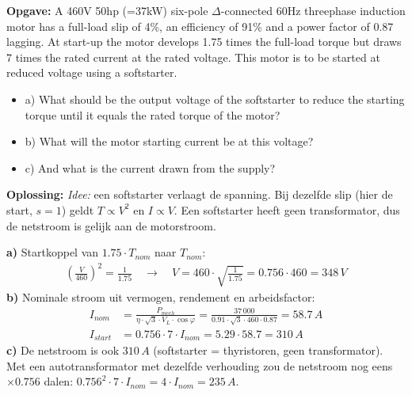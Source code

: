 \begin{oefenblok}
    \textbf{Opgave:}
    \newline
    A 460V 50hp (=37kW) six-pole $\Delta$-connected 60Hz threephase induction motor has a
    full-load slip of 4\%, an efficiency of 91\% and a power factor of 0.87 lagging.
    At start-up the motor develops 1.75 times the full-load torque but draws 7 times the
    rated current at the rated voltage.
    This motor is to be started at reduced voltage using a softstarter.
\begin{itemize}
 \item a) What should be the output voltage of the softstarter to reduce the starting
 torque until it equals the rated torque of the motor?
 \item b) What will the motor starting current be at this voltage?
 \item c) And what is the current drawn from the supply?
\end{itemize}
   \textbf{Oplossing:}
   \newline
      \textit{Idee:} een softstarter verlaagt de spanning.
   Bij dezelfde slip (hier de start, $s = 1$) geldt $T \propto V^2$ en $I \propto V$.
   Een softstarter heeft geen transformator, dus de netstroom is gelijk aan de motorstroom.

   \textbf{a)} Startkoppel van $1.75 \cdot T_{nom}$ naar $T_{nom}$:
   \begin{align}
       \left(\frac{V}{460}\right)^2 = \frac{1}{1.75} \quad \rightarrow \quad
       V = 460 \cdot \sqrt{\frac{1}{1.75}} = 0.756 \cdot 460 = 348\,V \tag{1}
   \end{align}
   \textbf{b)} Nominale stroom uit vermogen, rendement en arbeidsfactor:
   \begin{align}
       I_{nom} &= \frac{P_{mech}}{\eta \cdot \sqrt{3} \cdot V_L \cdot \cos\varphi}
       = \frac{37\,000}{0.91 \cdot \sqrt{3} \cdot 460 \cdot 0.87} = 58.7\,A \tag{2} \\
       I_{start} &= 0.756 \cdot 7 \cdot I_{nom} = 5.29 \cdot 58.7 = 310\,A \tag{3}
   \end{align}
   \textbf{c)} De netstroom is ook $310\,A$ (softstarter = thyristoren, geen
   transformator).
   Met een autotransformator met dezelfde verhouding zou de netstroom nog eens
   $\times 0.756$ dalen: $0.756^2 \cdot 7 \cdot I_{nom} = 4 \cdot I_{nom} = 235\,A$.
\end{oefenblok}


